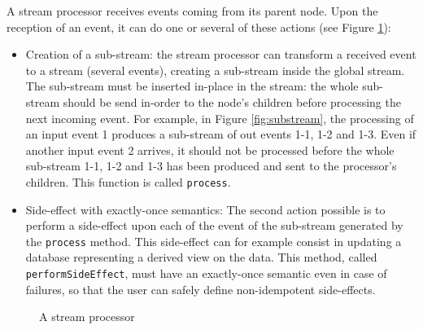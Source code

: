 A stream processor receives events coming from its parent node. Upon the reception of an event, it can do one or several of these
actions (see Figure \ref{fig:streamprocessor}):
\begin{itemize}
  \item Creation of a sub-stream: the stream processor can transform a received event to a stream (several events), creating a sub-stream
  inside the global stream. The sub-stream must be inserted in-place in the stream: the whole sub-stream should be
  send in-order to the node's children before processing the next incoming event. For example, in Figure \ref{fig:substream},
  the processing of an input event 1 produces a sub-stream of out events 1-1, 1-2 and 1-3. Even if another input event 2
  arrives, it should not be processed before the whole sub-stream 1-1, 1-2 and 1-3 has been produced and sent to the processor's 
  children. This function is called \verb|process|.
  \item Side-effect with exactly-once semantics: The second action possible is to perform a side-effect upon each of the event
  of the sub-stream generated by the \verb|process| method. This side-effect can for example consist in updating a database representing
  a derived view on the data. This method, called \verb|performSideEffect|, must have an exactly-once semantic even in case of failures, so that the user
  can safely define non-idempotent side-effects.
\end{itemize}

\begin{figure}[h]
  \begin{center} 
    \caption{A stream processor}
    \label{fig:streamprocessor}
  \end{center}
\end{figure}

